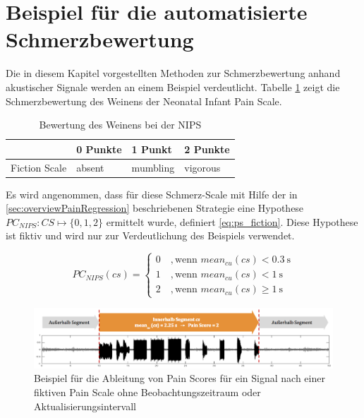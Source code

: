 \vspace{5mm}

\section{Beispiel für die automatisierte Schmerzbewertung}

Die in diesem Kapitel vorgestellten Methoden zur Schmerzbewertung anhand akustischer Signale werden an einem Beispiel verdeutlicht. Tabelle \ref{tab:fiction_scale} zeigt die Schmerzbewertung des Weinens der \glqq Neonatal Infant Pain Scale\grqq{}.

\begin{table}[h]
\centering
\caption[Bewertung des Weinens bei der NIPS]{Bewertung des Weinens bei der NIPS \cite{nips}}
\label{tab:fiction_scale}
\begin{tabular}{@{}llll@{}}
\toprule
              & 0 Punkte    & 1 Punkt         & 2 Punkte       \\ \midrule
Fiction Scale & absent & mumbling & vigorous \\ \bottomrule
\end{tabular}
\end{table}

Es wird angenommen, dass für diese Schmerz-Scale mit Hilfe der in \autoref{sec:overviewPainRegression} beschriebenen Strategie eine Hypothese $PC_{NIPS}: CS \mapsto \{0,1,2\}$ ermittelt wurde, definiert \autoref{eq:ps_fiction}. Diese Hypothese ist fiktiv und wird nur zur Verdeutlichung des Beispiels verwendet.

\begin{equation}
PC_{NIPS}(cs) = \begin{cases}
 0 \quad ,  \text{wenn } mean_{cu}(cs) < \SI{0.3}{\second} \\
 1 \quad ,  \text{wenn } mean_{cu}(cs) < \SI{1}{\second} \\
 2 \quad ,  \text{wenn } mean_{cu}(cs) \geq \SI{1}{\second}
 \end{cases}	
 \label{eq:ps_fiction}
\end{equation}

\begin{figure}[h]
	\centering
	\includegraphics[width=1\textwidth]{bilder/regression_score_example04.png}
	\caption{Beispiel für die Ableitung von Pain Scores für ein Signal nach einer fiktiven Pain Scale ohne Beobachtungszeitraum oder Aktualisierungsintervall}
	\label{img:regression_score_example01}
\end{figure}


